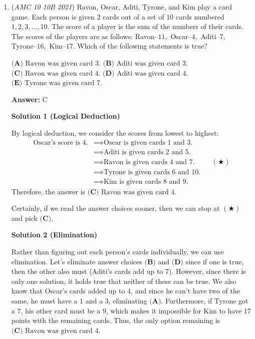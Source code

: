 \begin{enumerate}
 


	\item (\textit{AMC 10 10B 2021}) Ravon, Oscar, Aditi, Tyrone, and Kim play a card game. Each person is given $2$ cards out of a set of $10$ cards numbered $1,2,3, \dots,10.$ The score of a player is the sum of the numbers of their cards. The scores of the players are as follows: Ravon--$11,$ Oscar--$4,$ Aditi--$7,$ Tyrone--$16,$ Kim--$17.$ Which of the following statements is true?


 $\textbf{(A) }\text{Ravon was given card 3.}$
$\textbf{(B) }\text{Aditi was given card 3.}$
$\textbf{(C) }\text{Ravon was given card 4.}$
$\textbf{(D) }\text{Aditi was given card 4.}$
$\textbf{(E) }\text{Tyrone was given card 7.}$

 \textbf{Answer: }C



\textbf{Solution 1 (Logical Deduction)}

By logical deduction, we consider the scores from lowest to highest:
 \begin{align*} \text{Oscar's score is 4.} &\implies \text{Oscar is given cards 1 and 3.} \\ &\implies \text{Aditi is given cards 2 and 5.} \\ &\implies \text{Ravon is given cards 4 and 7.} && (\bigstar) \\ &\implies \text{Tyrone is given cards 6 and 10.} \\ &\implies \text{Kim is given cards 8 and 9.} \end{align*}
Therefore, the answer is $\boxed{\textbf{(C) }\text{Ravon was given card 4.}}$

 Certainly, if we read the answer choices sooner, then we can stop at $(\bigstar)$ and pick $\textbf{(C)}.$




\textbf{Solution 2 (Elimination)}

Rather than figuring out each person's cards individually, we can use elimination. Let's eliminate answer choices $\boxed{\textbf{(B)}}$ and $\boxed{\textbf{(D)}}$ since if one is true, then the other also must (Aditi's cards add up to $7$). However, since there is only one solution, it holds true that neither of these can be true. We also know that Oscar's cards added up to 4, and since he can't have two of the same, he must have a $1$ and a $3$, eliminating $\boxed{\textbf{(A)}}$. Furthermore, if Tyrone got a $7$, his other card must be a $9$, which makes it impossible for Kim to have 17 points with the remaining cards. Thus, the only option remaining is $\boxed{\textbf{(C) }\text{Ravon was given card 4.}}$




\end{enumerate}

